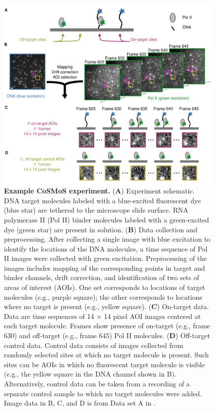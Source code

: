 \begin{figure}
\begin{fullwidth}
\centering
\includegraphics[width=145mm]{figures/cosmos_experiment/cosmos_experiment.png}
\caption{\textbf{Example CoSMoS experiment.} (\textbf{A}) Experiment schematic. DNA target molecules labeled with a blue-excited fluorescent dye (blue star) are tethered to the microscope slide surface. RNA polymerase II (Pol II) binder molecules labeled with a green-excited dye (green star) are present in solution. (\textbf{B}) Data collection and preprocessing. After collecting a single image with blue excitation to identify the locations of the DNA molecules, a time sequence of Pol II images were collected with green excitation.  Preprocessing of the images includes mapping of the corresponding points in target and binder channels, drift correction, and identification of two sets of areas of interest (AOIs).  One set corresponds to locations of target molecules (e.g., purple square); the other corresponds to locations where no target is present (e.g., yellow square). (\textbf{C}) On-target data. Data are time sequences of 14 $\times$ 14 pixel AOI images centered at each target molecule. Frames show presence of on-target (e.g., frame 630) and off-target (e.g., frame 645) Pol II molecules. (\textbf{D}) Off-target control data. Control data consists of images collected from randomly selected sites at which no target molecule is present. Such sites can be AOIs in which no fluorescent target molecule is visible (e.g., the yellow square in the DNA channel shown in B).  Alternatively, control data can be taken from a recording of a separate control sample to which no target molecules were added. Image data in B, C, and D is from Data set A in . }\label{fig:cosmos_experiment}
\end{fullwidth}
\end{figure}